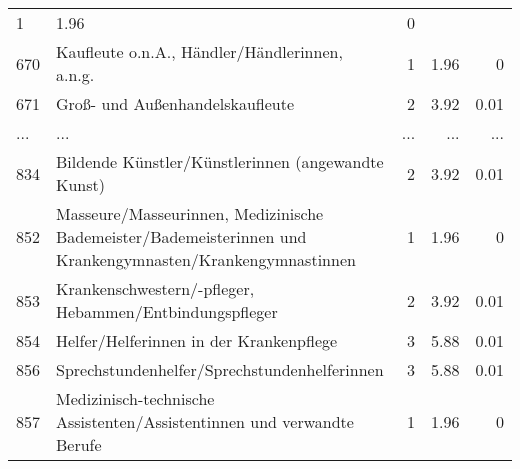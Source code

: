 \begin{longtable}{lXrrr}
          \num{1} &
          \num[round-mode=places,round-precision=2]{1,96} &
          \num[round-mode=places,round-precision=2]{0} \\
        670 & \multicolumn{1}{X}{Kaufleute o.n.A., Händler/Händlerinnen, a.n.g.} & %
          \num{1} &
          \num[round-mode=places,round-precision=2]{1,96} &
          \num[round-mode=places,round-precision=2]{0} \\
        671 & \multicolumn{1}{X}{Groß- und Außenhandelskaufleute} & %
          \num{2} &
          \num[round-mode=places,round-precision=2]{3,92} &
          \num[round-mode=places,round-precision=2]{0,01} \\
       ... & ... & ... & ... & ... \\
        834 & \multicolumn{1}{X}{Bildende Künstler/Künstlerinnen (angewandte Kunst)} & %
          \num{2} &
          \num[round-mode=places,round-precision=2]{3,92} &
          \num[round-mode=places,round-precision=2]{0,01} \\

        852 & \multicolumn{1}{X}{Masseure/Masseurinnen, Medizinische Bademeister/Bademeisterinnen und Krankengymnasten/Krankengymnastinnen} & %
          \num{1} &
          \num[round-mode=places,round-precision=2]{1,96} &
          \num[round-mode=places,round-precision=2]{0} \\

        853 & \multicolumn{1}{X}{Krankenschwestern/-pfleger, Hebammen/Entbindungspfleger} & %
          \num{2} &
          \num[round-mode=places,round-precision=2]{3,92} &
          \num[round-mode=places,round-precision=2]{0,01} \\

        854 & \multicolumn{1}{X}{Helfer/Helferinnen in der Krankenpflege} & %
          \num{3} &
          \num[round-mode=places,round-precision=2]{5,88} &
          \num[round-mode=places,round-precision=2]{0,01} \\

        856 & \multicolumn{1}{X}{Sprechstundenhelfer/Sprechstundenhelferinnen} & %
          \num{3} &
          \num[round-mode=places,round-precision=2]{5,88} &
          \num[round-mode=places,round-precision=2]{0,01} \\

        857 & \multicolumn{1}{X}{Medizinisch-technische Assistenten/Assistentinnen und verwandte Berufe} & %
          \num{1} &
          \num[round-mode=places,round-precision=2]{1,96} &
          \num[round-mode=places,round-precision=2]{0} \\


\end{longtable}
